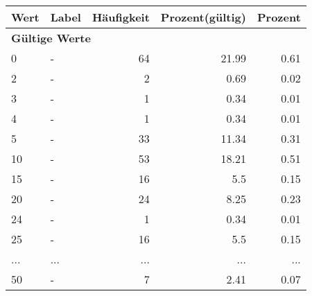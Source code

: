      \begin{longtable}{lXrrr}
     \toprule
     \textbf{Wert} & \textbf{Label} & \textbf{Häufigkeit} & \textbf{Prozent(gültig)} & \textbf{Prozent} \\
     \endhead
     \midrule
     \multicolumn{5}{l}{\textbf{Gültige Werte}}\\
        0 & \multicolumn{1}{X}{-} & %
          \num{64} &
          \num[round-mode=places,round-precision=2]{21.99} &
          \num[round-mode=places,round-precision=2]{0.61} \\
        2 & \multicolumn{1}{X}{-} & %
          \num{2} &
          \num[round-mode=places,round-precision=2]{0.69} &
          \num[round-mode=places,round-precision=2]{0.02} \\
        3 & \multicolumn{1}{X}{-} & %
          \num{1} &
          \num[round-mode=places,round-precision=2]{0.34} &
          \num[round-mode=places,round-precision=2]{0.01} \\
        4 & \multicolumn{1}{X}{-} & %
          \num{1} &
          \num[round-mode=places,round-precision=2]{0.34} &
          \num[round-mode=places,round-precision=2]{0.01} \\
        5 & \multicolumn{1}{X}{-} & %
          \num{33} &
          \num[round-mode=places,round-precision=2]{11.34} &
          \num[round-mode=places,round-precision=2]{0.31} \\
        10 & \multicolumn{1}{X}{-} & %
          \num{53} &
          \num[round-mode=places,round-precision=2]{18.21} &
          \num[round-mode=places,round-precision=2]{0.51} \\
        15 & \multicolumn{1}{X}{-} & %
          \num{16} &
          \num[round-mode=places,round-precision=2]{5.5} &
          \num[round-mode=places,round-precision=2]{0.15} \\
        20 & \multicolumn{1}{X}{-} & %
          \num{24} &
          \num[round-mode=places,round-precision=2]{8.25} &
          \num[round-mode=places,round-precision=2]{0.23} \\
        24 & \multicolumn{1}{X}{-} & %
          \num{1} &
          \num[round-mode=places,round-precision=2]{0.34} &
          \num[round-mode=places,round-precision=2]{0.01} \\
        25 & \multicolumn{1}{X}{-} & %
          \num{16} &
          \num[round-mode=places,round-precision=2]{5.5} &
          \num[round-mode=places,round-precision=2]{0.15} \\
       ... & ... & ... & ... & ... \\
        50 & \multicolumn{1}{X}{-} & %
          \num{7} &
          \num[round-mode=places,round-precision=2]{2.41} &
          \num[round-mode=places,round-precision=2]{0.07} \\


\end{longtable}
